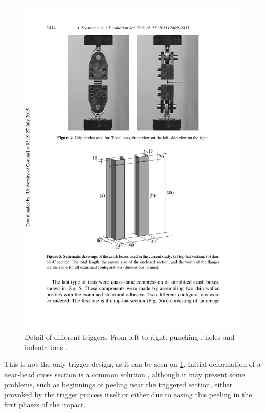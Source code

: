 \documentclass[cmfonts]{witpress}
\begin{document}
\begin{figure}
\begin{minipage}[b]{.45\linewidth}
		\includegraphics[width=\linewidth]{figures/IMG_CUTRES/scattina_trig}
	\end{minipage}
	\caption[Detail of different triggers: punching, holes and indentations.]{Detail of different triggers. From left to right: punching \cite{Abedrabbo2009}, holes \cite{Peroni2009} and indentations \cite{Scattina2011}.}
	\label{fig:different_trig}
\end{figure}

This is not the only trigger design, as it can be seen on \cref{fig:different_trig}. Initial deformation of a near-head cross section is a common solution \cite{Abedrabbo2009, Scattina2011, Costas2013}, although it may present some problems, such as beginnings of peeling near the triggered section, either provoked by the trigger process itself or either due to easing this peeling in the first phases of the impact.
\end{document}
